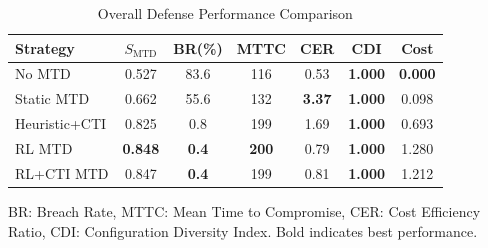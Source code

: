 \begin{table}[!t]
\centering
\caption{Overall Defense Performance Comparison}
\label{tab:overall_comparison}
\renewcommand{\arraystretch}{1.1}
\begin{tabular}{@{}lcccccc@{}}
\toprule
\textbf{Strategy} & $S_{\mathrm{MTD}}$ & \textbf{BR(\%)} & \textbf{MTTC} & \textbf{CER} & \textbf{CDI} & \textbf{Cost} \\
\midrule
No MTD & 0.527 & 83.6 & 116 & 0.53 & \textbf{1.000} & \textbf{0.000} \\
Static MTD & 0.662 & 55.6 & 132 & \textbf{3.37} & \textbf{1.000} & 0.098 \\
Heuristic+CTI & 0.825 & 0.8 & 199 & 1.69 & \textbf{1.000} & 0.693 \\
RL MTD & \textbf{0.848} & \textbf{0.4} & \textbf{200} & 0.79 & \textbf{1.000} & 1.280 \\
RL+CTI MTD & 0.847 & \textbf{0.4} & 199 & 0.81 & \textbf{1.000} & 1.212 \\
\bottomrule
\end{tabular}
\vspace{1mm}
\footnotesize{BR: Breach Rate, MTTC: Mean Time to Compromise, CER: Cost Efficiency Ratio, CDI: Configuration Diversity Index. Bold indicates best performance.}
\end{table}
